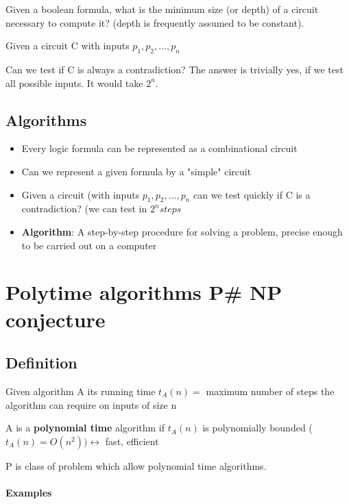 \documentclass[9pt, letterpaper, oneside]{article}
\newcommand*\dbl{\leftrightarrow}
\begin{document}
Given a boolean formula, what is the minimum size (or depth) of a circuit necessary to compute it?
(depth is frequently assumed to be constant).

Given a circuit C with inputs $p_1, p_2, ..., p_n$

Can we test if C is always a contradiction? The answer is trivially yes, if we test all possible inputs. It would take $2^n$.

\subsection{Algorithms}
\begin{itemize}
	\item Every logic formula can be represented as a combinational circuit
	\item Can we represent a given formula by a "simple" circuit
	\item Given a circuit (with inputs $p_1, p_2, ..., p_n$ can we test quickly if C is a contradiction? (we can test in $2^n steps$
	\item \textbf{Algorithm}: A step-by-step procedure for solving a problem, precise enough to be carried out on a computer
\end{itemize}


\section{Polytime algorithms P\# NP conjecture}

\subsection{Definition}
Given algorithm A its running time $t_A(n) =$ maximum number of steps the algorithm can require on inputs of size n

A is a \textbf{polynomial time} algorithm if $t_A(n)$ is polynomially bounded ($t_A(n)=O(n^2)) \dbl$ fast, efficient

P is class of problem which allow polynomial time algorithms.

\paragraph{Examples}
\end{document}
